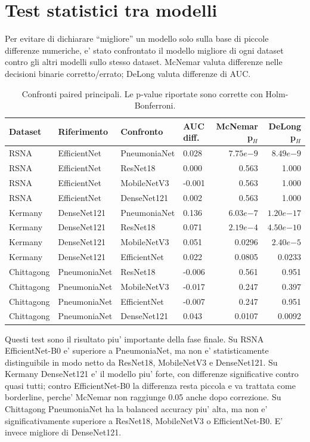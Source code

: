 \documentclass[11pt,a4paper]{article}
\newcommand{\balacc}{balanced accuracy}
\begin{document}
\section{Test statistici tra modelli}

Per evitare di dichiarare ``migliore'' un modello solo sulla base di piccole
differenze numeriche, e' stato confrontato il modello migliore di ogni dataset
contro gli altri modelli sullo stesso dataset. McNemar valuta differenze nelle
decisioni binarie corretto/errato; DeLong valuta differenze di AUC.

\begin{table}[H]
\centering
\caption{Confronti paired principali. Le p-value riportate sono corrette con Holm-Bonferroni.}
\begin{tabular}{llllrr}
\toprule
Dataset & Riferimento & Confronto & AUC diff. & McNemar p$_H$ & DeLong p$_H$ \\
\midrule
RSNA & EfficientNet & PneumoniaNet & 0.028 & $7.75e{-9}$ & $8.49e{-9}$ \\
RSNA & EfficientNet & ResNet18 & 0.000 & 0.563 & 1.000 \\
RSNA & EfficientNet & MobileNetV3 & -0.001 & 0.563 & 1.000 \\
RSNA & EfficientNet & DenseNet121 & 0.002 & 0.563 & 1.000 \\
\midrule
Kermany & DenseNet121 & PneumoniaNet & 0.136 & $6.03e{-7}$ & $1.20e{-17}$ \\
Kermany & DenseNet121 & ResNet18 & 0.071 & $2.19e{-4}$ & $4.50e{-10}$ \\
Kermany & DenseNet121 & MobileNetV3 & 0.051 & 0.0296 & $2.40e{-5}$ \\
Kermany & DenseNet121 & EfficientNet & 0.022 & 0.0805 & 0.0233 \\
\midrule
Chittagong & PneumoniaNet & ResNet18 & -0.006 & 0.561 & 0.951 \\
Chittagong & PneumoniaNet & MobileNetV3 & -0.017 & 0.247 & 0.397 \\
Chittagong & PneumoniaNet & EfficientNet & -0.007 & 0.247 & 0.951 \\
Chittagong & PneumoniaNet & DenseNet121 & 0.043 & 0.0107 & 0.0092 \\
\bottomrule
\end{tabular}
\end{table}

Questi test sono il risultato piu' importante della fase finale. Su RSNA
EfficientNet-B0 e' superiore a PneumoniaNet, ma non e' statisticamente
distinguibile in modo netto da ResNet18, MobileNetV3 e DenseNet121. Su Kermany
DenseNet121 e' il modello piu' forte, con differenze significative contro quasi
tutti; contro EfficientNet-B0 la differenza resta piccola e va trattata come
borderline, perche' McNemar non raggiunge 0.05 anche dopo correzione. Su
Chittagong PneumoniaNet ha la \balacc{} piu' alta, ma non e' significativamente
superiore a ResNet18, MobileNetV3 o EfficientNet-B0. E' invece migliore di
DenseNet121.
\end{document}
